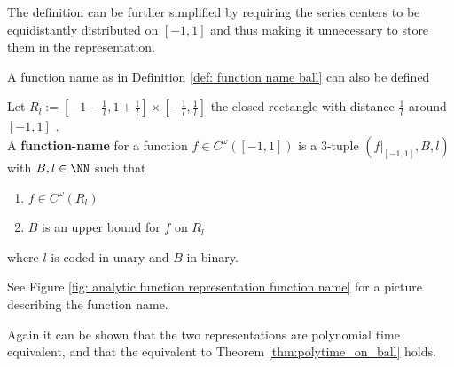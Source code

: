 	The definition can be further simplified by requiring the series centers to be equidistantly distributed on $[-1,1]$ and thus
	making it unnecessary to store them in the representation.

	A function name as in Definition \ref{def: function name ball} can also be defined
	\begin{definition}
		Let $R_l := [-1-\frac{1}{l}, 1+\frac{1}{l}] \times [-\frac{1}{l}, \frac{1}{l}]$ the closed rectangle with distance $\frac{1}{l}$ around $[-1,1]$ .\\
		A \textbf{function-name} for a function $f \in C^\omega([-1,1])$ is a 3-tuple $(f|_{[-1,1]}, B, l)$ with $B, l \in \NN$ such that 
		\begin{enumerate}
			\item $f \in C^\omega(R_l)$
			\item $B$ is an upper bound for $f$ on $R_l$
		\end{enumerate}
		where $l$ is coded in unary and $B$ in binary.
	\end{definition}
	See Figure \ref{fig: analytic function representation function name} for a picture describing the function name. 

	Again it can be shown that the two representations are polynomial time equivalent, and that the equivalent to
	Theorem \ref{thm:polytime_on_ball} holds.

